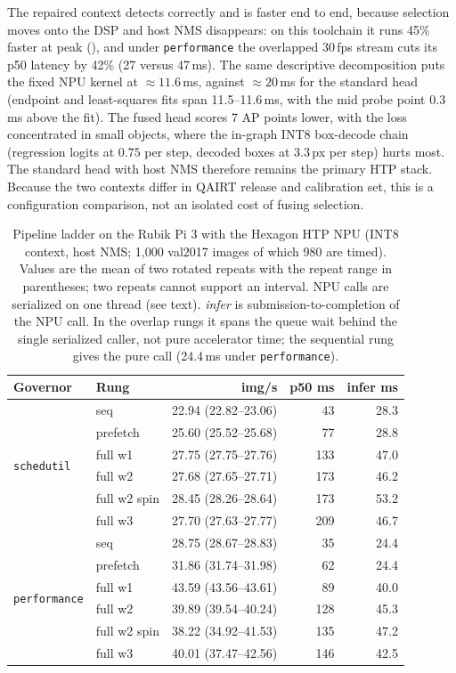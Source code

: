 The repaired context detects correctly and is faster end to end,
because selection moves onto the DSP and host NMS disappears: on this
toolchain it runs 45\% faster at peak (), and
under \texttt{performance} the overlapped 30\,fps stream cuts its p50
latency by 42\% (27 versus 47\,ms). The same descriptive decomposition
puts the fixed NPU kernel at ${\approx}11.6$\,ms, against
${\approx}20$\,ms for the standard head (endpoint and least-squares
fits span 11.5--11.6\,ms, with the mid probe point $0.3$\,ms above the
fit). The fused head scores 7 AP points lower, with the loss
concentrated in small objects, where the in-graph INT8 box-decode chain
(regression logits at $0.75$ per step, decoded boxes at $3.3$\,px per
step) hurts most. The standard head with host NMS therefore remains
the primary HTP stack. Because the two contexts differ in QAIRT release
and calibration set, this is a configuration comparison, not an
isolated cost of fusing selection.

\begin{table}[t]
\centering
\caption{Pipeline ladder on the Rubik Pi 3 with the Hexagon HTP NPU
(INT8 context, host NMS; 1,000 val2017 images of which 980 are timed).
Values are the mean of two rotated repeats with the repeat range in
parentheses; two repeats cannot support an interval. NPU calls are
serialized on one thread (see text). \emph{infer} is
submission-to-completion of the NPU call. In the overlap rungs it spans
the queue wait behind the single serialized caller, not pure
accelerator time; the sequential rung gives the pure call (24.4\,ms
under \texttt{performance}).}
\label{tab:rubikhtpladder}
\footnotesize
\setlength{\tabcolsep}{3pt}
\begin{tabular}{@{}llrrr@{}}
\toprule
Governor & Rung & img/s & p50 ms & infer ms \\
\midrule
\multirow{6}{*}{\texttt{schedutil}}
 & seq           & 22.94 (22.82--23.06) &  43 & 28.3 \\
 & prefetch      & 25.60 (25.52--25.68) &  77 & 28.8 \\
 & full w1       & 27.75 (27.75--27.76) & 133 & 47.0 \\
 & full w2       & 27.68 (27.65--27.71) & 173 & 46.2 \\
 & full w2 spin  & 28.45 (28.26--28.64) & 173 & 53.2 \\
 & full w3       & 27.70 (27.63--27.77) & 209 & 46.7 \\
\midrule
\multirow{6}{*}{\texttt{performance}}
 & seq           & 28.75 (28.67--28.83) &  35 & 24.4 \\
 & prefetch      & 31.86 (31.74--31.98) &  62 & 24.4 \\
 & full w1       & 43.59 (43.56--43.61) &  89 & 40.0 \\
 & full w2       & 39.89 (39.54--40.24) & 128 & 45.3 \\
 & full w2 spin  & 38.22 (34.92--41.53) & 135 & 47.2 \\
 & full w3       & 40.01 (37.47--42.56) & 146 & 42.5 \\
\bottomrule
\end{tabular}
\end{table}

